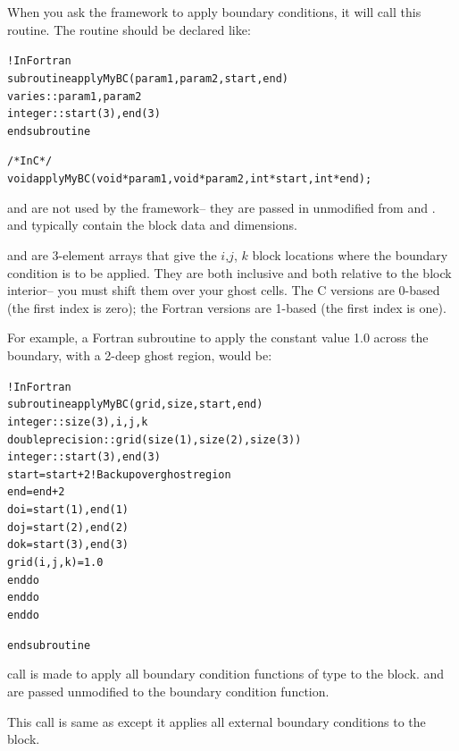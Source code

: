 \documentclass[10pt]{article}
\begin{document}
When you ask the framework to apply boundary conditions, it will call this
routine.  The routine should be declared like:

\begin{alltt}
	!In Fortran
	subroutine applyMyBC(param1,param2,start,end)
	varies :: param1, param2
	integer :: start(3), end(3)
	end subroutine

	/* In C */
	void applyMyBC(void *param1,void *param2,int *start,int *end);	
\end{alltt}
 
 and  are not used by the framework-- they are
passed in unmodified from  and .
 and  typically contain the block data and dimensions.  

 and  are 3-element arrays that give the $i$,$j$, $k$ 
block locations where the boundary condition
is to be applied.  They are both inclusive and both relative to the 
block interior-- you must shift them over your ghost cells.  The C versions
are 0-based (the first index is zero); the Fortran versions are 1-based
(the first index is one).  

For example, a Fortran subroutine to apply the constant value 1.0 across the
boundary, with a 2-deep ghost region, would be:

\begin{alltt}
	!In Fortran
	subroutine applyMyBC(grid,size,start,end)
	integer :: size(3), i,j,k
	double precision :: grid(size(1),size(2),size(3))
	integer :: start(3), end(3)
	start=start+2 ! Back up over ghost region
	end=end+2
	do i=start(1),end(1)
	do j=start(2),end(2)
	do k=start(3),end(3)
	    grid(i,j,k)=1.0
	end do
	end do
	end do

	end subroutine	
\end{alltt}


\vspace{0.2in}
 call is made to apply all boundary condition functions
of type  to the block.   and  are passed unmodified
to the boundary condition function.

\vspace{0.2in}
This call is same as  except it applies all 
external boundary conditions to the block.
\end{document}
